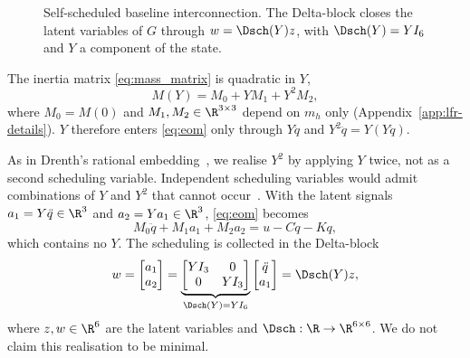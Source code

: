 \begin{figure}[t]
  \centering
  
  \caption{Self-scheduled baseline interconnection. The Delta-block closes
  the latent variables of $G$ through $w=\Dsch(Y)z$, with
  $\Dsch(Y)=YI_6$ and $Y$ a component of the state.}
  \label{fig:lfr}
\end{figure}

The inertia matrix \eqref{eq:mass_matrix} is quadratic in $Y$,
\begin{equation}
  M(Y)=M_0+YM_1+Y^2M_2,
  \label{eq:Msplit}
\end{equation}
where $M_0=M(0)$ and $M_1,M_2\in\R^{3\times3}$ depend on $m_h$ only
(Appendix~\ref{app:lfr-details}).
$Y$ therefore enters \eqref{eq:eom} only through $Y\ddot q$ and
$Y^2\ddot q=Y(Y\ddot q)$.

As in Drenth's rational embedding~\cite[Eq.~(2.9)]{drenth2025thesis}, we
realise $Y^2$ by applying $Y$ twice, not as a second scheduling variable.
Independent scheduling variables would admit combinations of $Y$ and $Y^2$
that cannot occur~\cite[Sec.~2.1.1]{drenth2025thesis}.
With the latent signals $a_1=Y\ddot q\in\R^3$ and $a_2=Ya_1\in\R^3$,
\eqref{eq:eom} becomes
\begin{equation}
  M_0\ddot q+M_1a_1+M_2a_2=u-C\dot q-Kq,
  \label{eq:lfr_constant}
\end{equation}
which contains no $Y$.
The scheduling is collected in the Delta-block
\begin{equation}
  w=\begin{bmatrix}a_1\\a_2\end{bmatrix}
   =\underbrace{\begin{bmatrix}YI_3&0\\0&YI_3\end{bmatrix}}_{\Dsch(Y)=YI_6}
    \begin{bmatrix}\ddot q\\a_1\end{bmatrix}
   =\Dsch(Y)z,
  \label{eq:delta}
\end{equation}
where $z,w\in\R^6$ are the latent variables and
$\Dsch:\R\to\R^{6\times6}$.
We do not claim this realisation to be minimal.

